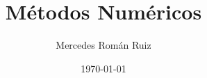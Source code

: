 \documentclass[10pt, a4paper, twoside, twocolumn]{book}
\title{Métodos Numéricos}
\author{Mercedes Román Ruiz}
\date{\today}
\theoremstyle{definition}
\begin{document}
\sloppy 
\setlength{\parindent}{30pt}
\setlength{\parskip}{6pt}
\renewcommand\thesection{\arabic{section}}
\renewcommand{\baselinestretch}{1.5}
\renewcommand{\listtablename}{Índice de tablas} %
\renewcommand{\tablename}{Tabla} %
\renewcommand{\baselinestretch}{1.5}

\fancyhead{}
\fancyfoot{}
\pagestyle{fancy}
\chead[\rightmark]{\leftmark}

\fancyfoot[LE,RO]{\thepage}



%





\nocite{*}
\printbibliography
\end{document}
